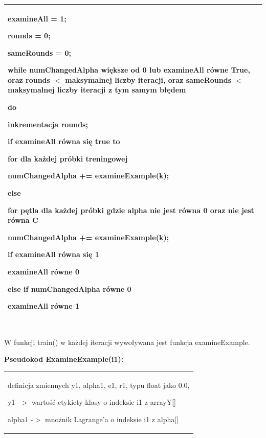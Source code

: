 \documentclass[[10pt,a4paper]{article}
\begin{document}
\begin{enumerate}
\begin{tabular}{|p{11.5cm}|}
 examineAll = 1;

 rounds = 0;

 sameRounds = 0;

\noindent \textbf{while} numChangedAlpha większe od 0 lub examineAll równe True, oraz rounds $<$ maksymalnej liczby iteracji, oraz sameRounds $<$ maksymalnej liczby iteracji z tym samym błędem

 \hspace{1em}do 

  \hspace{2em}inkrementacja rounds;

  \hspace{2em}\textbf{if} examineAll równa się true to

   \hspace{3em}for dla ka\.{z}dej próbki treningowej

    \hspace{4em}numChangedAlpha += examineExample(k);

  \hspace{2em}\textbf{else}

   \hspace{3em}for pętla dla każdej próbki gdzie alpha nie jest równa 0 oraz nie jest równa C

   \hspace{4em}numChangedAlpha += examineExample(k);

  \hspace{2em}\textbf{if} examineAll równa si\k{e} 1

   \hspace{3em}examineAll równe 0

  \hspace{2em}\textbf{else if} numChangedAlpha równe 0 

   \hspace{3em}examineAll równe 1
\\ \hline
\end{tabular}
 \\ W funkcji train() w każdej iteracji wywoływana jest funkcja examineExample.

 
\newpage
\noindent 
\noindent \textbf{Pseudokod ExamineExample(i1):}\\
\begin{tabular}{|p{11.5cm}|} \hline
\noindent definicja zmiennych y1, alpha1, e1, r1, typu float jako 0.0,

\noindent y1 -$>$ warto\'{s}\'{c} etykiety klasy o indeksie i1 z arrayY[]

\noindent alpha1 -$>$ mnożnik Lagrange'a o indeksie i1 z alpha[]


\end{tabular}
\end{enumerate}
\end{document}

